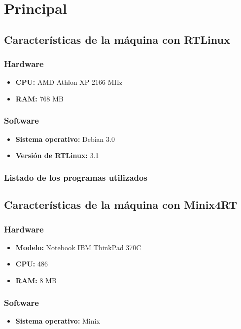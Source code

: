 \section{Principal}

\subsection{Características de la máquina con RTLinux}

\subsubsection{Hardware}
\begin{itemize}
\item \textbf{CPU:} AMD Athlon XP 2166 MHz
\item \textbf{RAM:} 768 MB
\end{itemize}

\subsubsection{Software}
\begin{itemize}
\item \textbf{Sistema operativo:} Debian 3.0
\item \textbf{Versión de RTLinux:} 3.1
\end{itemize}

\subsubsection{Listado de los programas utilizados}


\subsection{Características de la máquina con Minix4RT}

\subsubsection{Hardware}
\begin{itemize}
\item \textbf{Modelo:} Notebook IBM ThinkPad 370C
\item \textbf{CPU:} 486
\item \textbf{RAM:} 8 MB
\end{itemize}

\subsubsection{Software}
\begin{itemize}
\item \textbf{Sistema operativo:} Minix 
\end{itemize}

